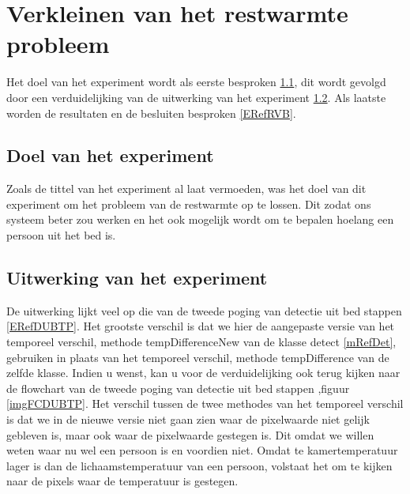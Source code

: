  \section{Verkleinen van het restwarmte probleem}
 \label{ERefRWV}
 Het doel van het experiment wordt als eerste besproken \ref{ERefRVD}, dit wordt gevolgd door een verduidelijking van de uitwerking van het experiment \ref{ERefRVV}. Als laatste worden de resultaten en de besluiten besproken \ref{ERefRVB}.
 
 \subsection {Doel van het experiment}
 \label{ERefRVD}
 Zoals de tittel van het experiment al laat vermoeden, was het doel van dit experiment om het probleem van de restwarmte op te lossen. Dit zodat ons systeem beter zou werken en het ook mogelijk wordt om te bepalen hoelang een persoon uit het bed is. 
 
 \subsection{Uitwerking van het experiment}
 \label{ERefRVV}
 De uitwerking lijkt veel op die van de tweede poging van detectie uit bed stappen \ref{ERefDUBTP}. Het grootste verschil is dat we hier de aangepaste versie van het temporeel verschil, methode tempDifferenceNew van de klasse detect \ref{mRefDet}, gebruiken in plaats van het temporeel verschil, methode tempDifference van de zelfde klasse. Indien u wenst, kan u voor de verduidelijking ook terug kijken naar de flowchart van de tweede poging van detectie uit bed stappen ,figuur \ref{imgFCDUBTP}. Het verschil tussen de twee methodes van het temporeel verschil is dat we in de nieuwe versie niet gaan zien waar de pixelwaarde niet gelijk gebleven is, maar ook waar de pixelwaarde gestegen is. Dit omdat we willen weten waar nu wel een persoon is en voordien niet. Omdat te kamertemperatuur lager is dan de lichaamstemperatuur van een persoon, volstaat het om te kijken naar de pixels waar de temperatuur is gestegen. 
 
 

